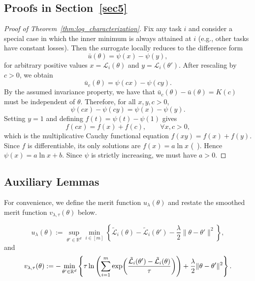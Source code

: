 \documentclass[sigconf]{acmart}
\begin{document}
\subsection{Proofs in Section~\ref{sec5}}
\begin{proof}[Proof of Theorem~\ref{thm:log_characterization}]
Fix any task $i$ and consider a special case in which the inner minimum is always attained at $i$ (e.g., other tasks have constant losses). Then the surrogate locally reduces to the difference form
\[
\bar u(\theta)=\psi(x)-\psi(y),
\]
for arbitrary positive values $x=\mathcal{L}_i(\theta)$ and
$y=\mathcal{L}_i(\theta')$. After rescaling by $c>0$, we obtain
\[
\bar u_c(\theta)=\psi(c x)-\psi(c y).
\]
By the assumed invariance property, we have that
$\bar u_c(\theta)-\bar u(\theta)=K(c)$ must be independent of $\theta$. Therefore, for all $x,y,c>0$,
\[
\psi(c x)-\psi(c y)=\psi(x)-\psi(y).
\]
Setting $y=1$ and defining $f(t)=\psi(t)-\psi(1)$ gives
\[
f(c x)=f(x)+f(c),\qquad \forall x,c>0,
\]
which is the multiplicative Cauchy functional equation
$f(xy)=f(x)+f(y)$.
Since $f$ is differentiable, its only solutions are $f(x)=a\ln x$ (~\citet{kuczma2009introduction}). Hence $\psi(x)=a\ln x+b$. Since $\psi$ is strictly increasing, we must have $a>0$.
\end{proof}


\subsection{Auxiliary Lemmas}
\label{app:aux_lemmas}
For convenience, we define the merit function $u_\lambda(\theta)$ and restate
the smoothed merit function $v_{\lambda,\tau}(\theta)$ below.

\begin{equation}
\label{eq:u_lambda}
u_\lambda(\theta) := \sup_{\theta'\in \mathbb{R}^d} \min_{i\in[m]}
\left\{\tilde{\mathcal{L}}_i(\theta)-\tilde{\mathcal{L}}_i(\theta')- \frac{\lambda}{2}\|\theta-\theta'\|^2\right\},
\end{equation}
and
\begin{equation}
\label{eq:v_lambda_tau}
v_{\lambda,\tau}(\theta) :=
-\min_{\theta'\in \mathbb{R}^d}\left\{\tau \ln
\left(\sum_{i=1}^m \exp\!\left(
\frac{\tilde{\mathcal{L}}_i(\theta')-\tilde{\mathcal{L}}_i(\theta)}{\tau}
\right)\right)+\frac{\lambda}{2}\|\theta-\theta'\|^2\right\}.\notag 
\end{equation}
\end{document}
